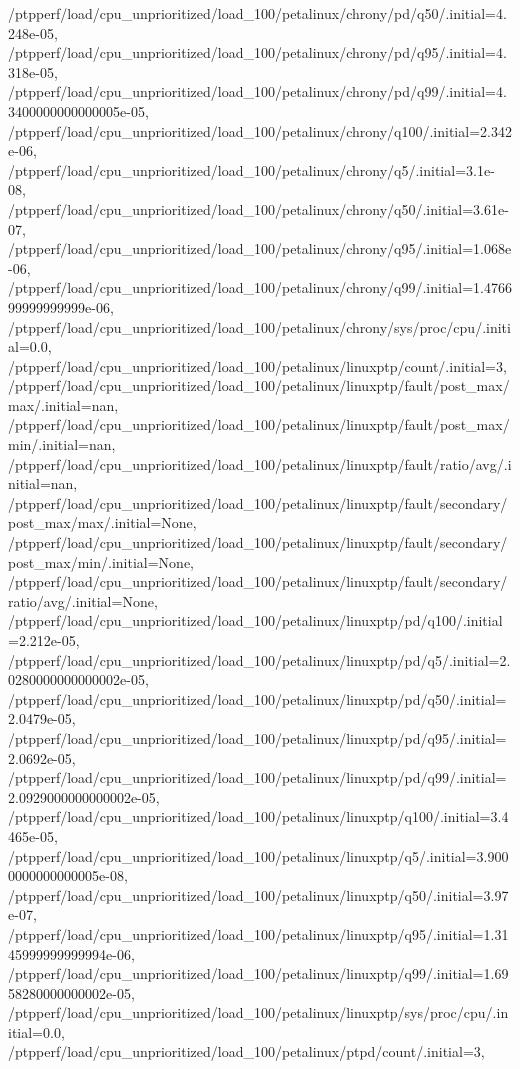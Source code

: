 {    /ptpperf/load/cpu_unprioritized/load_100/petalinux/chrony/pd/q50/.initial=4.248e-05,
    /ptpperf/load/cpu_unprioritized/load_100/petalinux/chrony/pd/q95/.initial=4.318e-05,
    /ptpperf/load/cpu_unprioritized/load_100/petalinux/chrony/pd/q99/.initial=4.3400000000000005e-05,
    /ptpperf/load/cpu_unprioritized/load_100/petalinux/chrony/q100/.initial=2.342e-06,
    /ptpperf/load/cpu_unprioritized/load_100/petalinux/chrony/q5/.initial=3.1e-08,
    /ptpperf/load/cpu_unprioritized/load_100/petalinux/chrony/q50/.initial=3.61e-07,
    /ptpperf/load/cpu_unprioritized/load_100/petalinux/chrony/q95/.initial=1.068e-06,
    /ptpperf/load/cpu_unprioritized/load_100/petalinux/chrony/q99/.initial=1.476699999999999e-06,
    /ptpperf/load/cpu_unprioritized/load_100/petalinux/chrony/sys/proc/cpu/.initial=0.0,
    /ptpperf/load/cpu_unprioritized/load_100/petalinux/linuxptp/count/.initial=3,
    /ptpperf/load/cpu_unprioritized/load_100/petalinux/linuxptp/fault/post_max/max/.initial=nan,
    /ptpperf/load/cpu_unprioritized/load_100/petalinux/linuxptp/fault/post_max/min/.initial=nan,
    /ptpperf/load/cpu_unprioritized/load_100/petalinux/linuxptp/fault/ratio/avg/.initial=nan,
    /ptpperf/load/cpu_unprioritized/load_100/petalinux/linuxptp/fault/secondary/post_max/max/.initial=None,
    /ptpperf/load/cpu_unprioritized/load_100/petalinux/linuxptp/fault/secondary/post_max/min/.initial=None,
    /ptpperf/load/cpu_unprioritized/load_100/petalinux/linuxptp/fault/secondary/ratio/avg/.initial=None,
    /ptpperf/load/cpu_unprioritized/load_100/petalinux/linuxptp/pd/q100/.initial=2.212e-05,
    /ptpperf/load/cpu_unprioritized/load_100/petalinux/linuxptp/pd/q5/.initial=2.0280000000000002e-05,
    /ptpperf/load/cpu_unprioritized/load_100/petalinux/linuxptp/pd/q50/.initial=2.0479e-05,
    /ptpperf/load/cpu_unprioritized/load_100/petalinux/linuxptp/pd/q95/.initial=2.0692e-05,
    /ptpperf/load/cpu_unprioritized/load_100/petalinux/linuxptp/pd/q99/.initial=2.0929000000000002e-05,
    /ptpperf/load/cpu_unprioritized/load_100/petalinux/linuxptp/q100/.initial=3.4465e-05,
    /ptpperf/load/cpu_unprioritized/load_100/petalinux/linuxptp/q5/.initial=3.9000000000000005e-08,
    /ptpperf/load/cpu_unprioritized/load_100/petalinux/linuxptp/q50/.initial=3.97e-07,
    /ptpperf/load/cpu_unprioritized/load_100/petalinux/linuxptp/q95/.initial=1.3145999999999994e-06,
    /ptpperf/load/cpu_unprioritized/load_100/petalinux/linuxptp/q99/.initial=1.6958280000000002e-05,
    /ptpperf/load/cpu_unprioritized/load_100/petalinux/linuxptp/sys/proc/cpu/.initial=0.0,
    /ptpperf/load/cpu_unprioritized/load_100/petalinux/ptpd/count/.initial=3,
}

